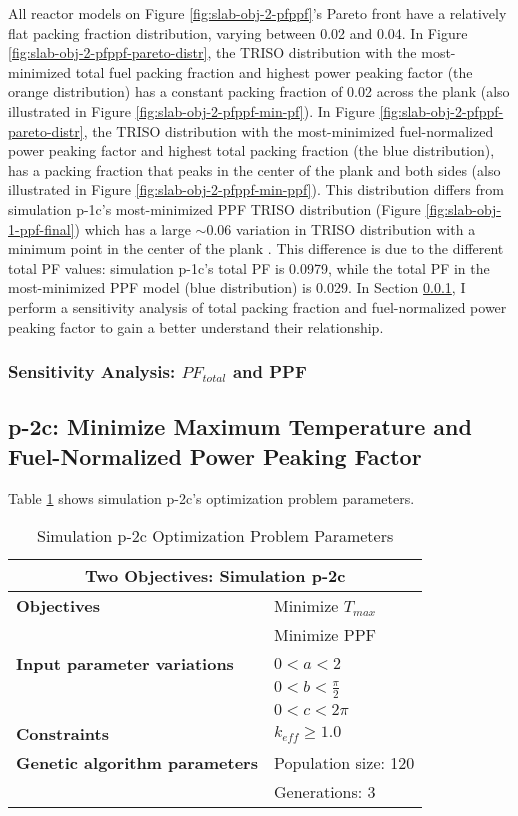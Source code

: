 All reactor models on Figure \ref{fig:slab-obj-2-pfppf}'s Pareto front have a relatively flat 
packing fraction distribution, varying between 0.02 and 0.04. 
In Figure \ref{fig:slab-obj-2-pfppf-pareto-distr}, the TRISO distribution with the 
most-minimized total fuel packing fraction and highest power peaking factor 
(the orange distribution) has a constant packing fraction of 0.02 across the plank
(also illustrated in Figure \ref{fig:slab-obj-2-pfppf-min-pf}). 
In Figure \ref{fig:slab-obj-2-pfppf-pareto-distr}, the TRISO distribution with the 
most-minimized fuel-normalized power peaking factor and highest total packing fraction 
(the blue distribution), has a packing fraction that peaks in the center of the plank
and both sides (also illustrated in Figure \ref{fig:slab-obj-2-pfppf-min-ppf}). 
This distribution differs from simulation p-1c's most-minimized PPF TRISO distribution 
(Figure \ref{fig:slab-obj-1-ppf-final}) which has a large $\sim 0.06$ variation in
TRISO distribution with a minimum point in the center of the plank . 
This difference is due to the different total PF values: simulation p-1c's total PF is 
0.0979, while the total PF in the most-minimized PPF model (blue distribution) is 0.029. 
In Section \ref{sec:p-2b-pf-ppf-study}, I perform a sensitivity analysis of total packing 
fraction and fuel-normalized power peaking factor to gain a better understand their 
relationship. 

\subsubsection{Sensitivity Analysis: $PF_{total}$ and PPF}
\label{sec:p-2b-pf-ppf-study}

\subsection{p-2c: Minimize Maximum Temperature and Fuel-Normalized Power Peaking Factor}
\label{sec:p-2c}
Table \ref{tab:simulationp2c} shows simulation p-2c's optimization problem parameters. 
\begin{table}[htbp!]
    \centering
    \onehalfspacing
    \caption{Simulation p-2c Optimization Problem Parameters}
	\label{tab:simulationp2c}
    \footnotesize
    \begin{tabular}{l|p{3cm}}
    \hline 
    \multicolumn{2}{c}{\textbf{Two Objectives: Simulation p-2c}} \\
    \hline 
    \textbf{Objectives} & Minimize $T_{max}$ \\
    & Minimize PPF \\
    \hline 
    \textbf{Input parameter variations} & $0<a<2$ \\
    & $0<b<\frac{\pi}{2}$ \\
    & $0<c<2\pi$ \\
    \hline
    \textbf{Constraints} & $k_{eff} \geq 1.0$\\ 
    \hline 
    \textbf{Genetic algorithm parameters} & Population size: 120 \\
    & Generations: 3 \\
    \hline
    \end{tabular}
\end{table}

